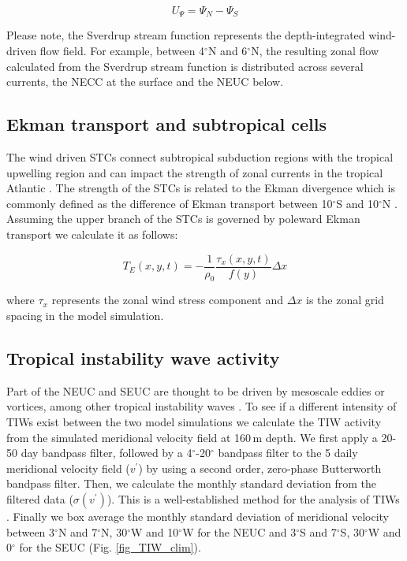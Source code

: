 \documentclass[os, manuscript]{copernicus}
\begin{document}
	\begin{equation}
		U_{\Psi} = \Psi_N - \Psi_S
		\label{equ_SV_diff}
	\end{equation}
	
	Please note, the Sverdrup stream function represents the depth-integrated wind-driven flow field. For example, between 4$^{\circ}$N and 6$^{\circ}$N, the resulting zonal flow calculated from the Sverdrup stream function is distributed across several currents, the NECC at the surface and the NEUC below.
	
	\subsection{Ekman transport and subtropical cells}
	The wind driven STCs connect subtropical subduction regions with the tropical upwelling region \citep[e.g.,][]{Schott2004,Tuchen2019} and can impact the strength of zonal currents in the tropical Atlantic \citep{Rabe2008}. The strength of the STCs is related to the Ekman divergence which is commonly defined as the difference of Ekman transport between 10$^{\circ}$S and 10$^{\circ}$N \citep{Rabe2008,Tuchen2019}. Assuming the upper branch of the STCs is governed by poleward Ekman transport we calculate it as follows:
	
	\begin{equation}
		T_E(x,y,t) = - \frac{1}{\rho_0}\frac{\tau_x(x,y,t)}{f(y)}\Delta x
		\label{equ_Ekman}
	\end{equation}
	
	where $\tau_x$ represents the zonal wind stress component and $\Delta x$ is the zonal grid spacing in the model simulation.
	
	\subsection{Tropical instability wave activity}
	Part of the NEUC and SEUC are thought to be driven by mesoscale eddies or vortices, among other tropical instability waves \citep[TIWs, e.g. ][]{Jochum2004b,Assene2020}. To see if a different intensity of TIWs exist between the two model simulations we calculate the TIW activity from the simulated meridional velocity field at 160$\,$m depth. We first apply a 20-50 day bandpass filter, followed by a 4$^{\circ}$-20$^{\circ}$ bandpass filter to the 5 daily meridional velocity field ($ v^\prime $) by using a second order, zero-phase Butterworth bandpass filter. Then, we calculate the monthly standard deviation from the filtered data ($ \sigma(v^\prime) $). This is a well-established method for the analysis of TIWs \citep{Lee2014, Olivier2020,Perez2012,Tuchen2022a}. Finally we box average the monthly standard deviation of meridional velocity between 3$^{\circ}$N and 7$^{\circ}$N, 30$^{\circ}$W and 10$^{\circ}$W for the NEUC and 3$^{\circ}$S and 7$^{\circ}$S, 30$^{\circ}$W and 0$^{\circ}$ for the SEUC (Fig. \ref{fig_TIW_clim}). 
	
\end{document}
